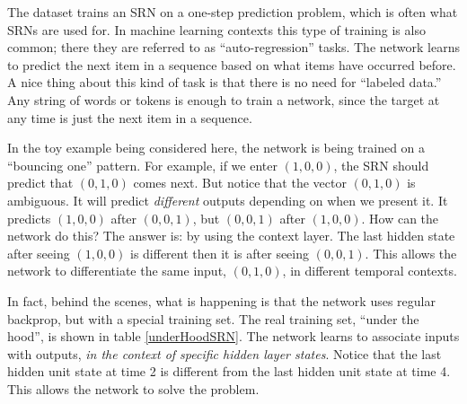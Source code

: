  The dataset trains an SRN on a one-step prediction problem, which is often what SRNs are used for. In machine learning contexts this type of training is also common; there they are referred to as ``auto-regression'' tasks.  The network learns to predict the next item in a sequence based on what items have occurred before. A nice thing about this kind of task is that there is no need for ``labeled data.'' Any string of words or tokens is enough to train a network, since the target at any time is just the next item in a sequence. 
 
In the toy example being considered here, the network is being trained on a ``bouncing one'' pattern. For example, if we enter $(1,0,0)$, the SRN should predict that $(0,1,0)$  comes next. But notice that the vector $(0,1,0)$ is ambiguous. It will predict \emph{different} outputs depending on when we present it. It predicts  $(1,0,0)$ after  $(0,0,1)$, but  $(0,0,1)$ after  $(1,0,0)$. How can the network do this? The answer is: by using the context  layer. The last hidden state after seeing $(1,0,0)$ is different then it is after seeing $(0,0,1)$. This allows the network to differentiate the same input, $(0,1,0)$, in different temporal contexts. 
 
 In fact, behind the scenes, what is happening is that the network uses regular backprop, but with a special training set. The real training set, ``under the hood'', is shown in table \ref{underHoodSRN}.  The network learns to associate inputs with outputs, \emph{in the context of specific hidden layer states}. Notice that the last hidden unit state at time 2 is different from the last hidden unit state at time 4. This allows the network to solve the problem.

